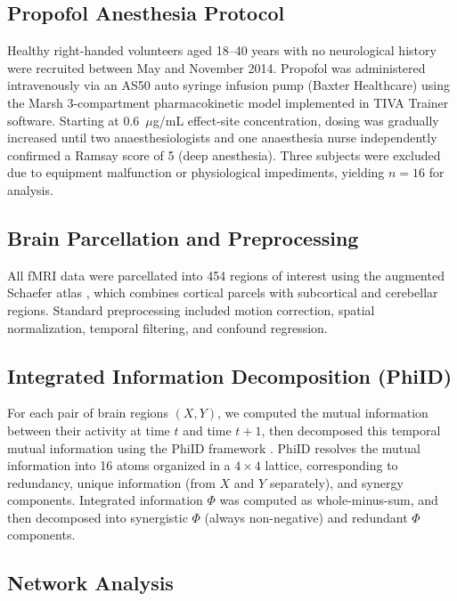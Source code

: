 \documentclass[11pt]{article}
\begin{document}
\subsection{Propofol Anesthesia Protocol}

Healthy right-handed volunteers aged 18--40 years with no neurological history were recruited between May and November 2014. Propofol was administered intravenously via an AS50 auto syringe infusion pump (Baxter Healthcare) using the Marsh 3-compartment pharmacokinetic model implemented in TIVA Trainer software. Starting at 0.6~$\mu$g/mL effect-site concentration, dosing was gradually increased until two anaesthesiologists and one anaesthesia nurse independently confirmed a Ramsay score of 5 (deep anesthesia). Three subjects were excluded due to equipment malfunction or physiological impediments, yielding $n = 16$ for analysis.

\subsection{Brain Parcellation and Preprocessing}

All fMRI data were parcellated into 454 regions of interest using the augmented Schaefer atlas \citep{schaefer2018local}, which combines cortical parcels with subcortical and cerebellar regions. Standard preprocessing included motion correction, spatial normalization, temporal filtering, and confound regression.

\subsection{Integrated Information Decomposition (PhiID)}

For each pair of brain regions $(X, Y)$, we computed the mutual information between their activity at time $t$ and time $t + 1$, then decomposed this temporal mutual information using the PhiID framework \citep{mediano2021towards, williams1999partial}. PhiID resolves the mutual information into 16 atoms organized in a $4 \times 4$ lattice, corresponding to redundancy, unique information (from $X$ and $Y$ separately), and synergy components. Integrated information $\Phi$ was computed as whole-minus-sum, and then decomposed into synergistic $\Phi$ (always non-negative) and redundant $\Phi$ components.

\subsection{Network Analysis}
\end{document}
